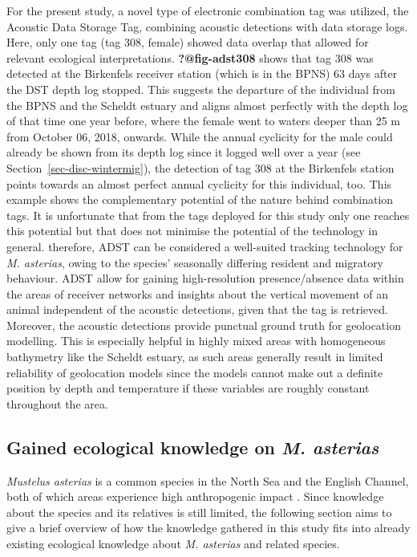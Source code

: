 \documentclass[
  authoryear,
  review,
  3p]{elsarticle}
\begin{document}
For the present study, a novel type of electronic combination tag was
utilized, the Acoustic Data Storage Tag, combining acoustic detections
with data storage logs. Here, only one tag (tag 308, female) showed data
overlap that allowed for relevant ecological interpretations.
\textbf{?@fig-adst308} shows that tag 308 was detected at the Birkenfels
receiver station (which is in the BPNS) 63 days after the DST depth log
stopped. This suggests the departure of the individual from the BPNS and
the Scheldt estuary and aligns almost perfectly with the depth log of
that time one year before, where the female went to waters deeper than
25 m from October 06, 2018, onwards. While the annual cyclicity for the
male could already be shown from its depth log since it logged well over
a year (see Section~\ref{sec-disc-wintermig}), the detection of tag 308
at the Birkenfels station points towards an almost perfect annual
cyclicity for this individual, too. This example shows the complementary
potential of the nature behind combination tags. It is unfortunate that
from the tags deployed for this study only one reaches this potential
but that does not minimise the potential of the technology in general.
therefore, ADST can be considered a well-suited tracking technology for
\emph{M. asterias}, owing to the species' seasonally differing resident
and migratory behaviour. ADST allow for gaining high-resolution
presence/absence data within the areas of receiver networks and insights
about the vertical movement of an animal independent of the acoustic
detections, given that the tag is retrieved. Moreover, the acoustic
detections provide punctual ground truth for geolocation modelling. This
is especially helpful in highly mixed areas with homogeneous bathymetry
like the Scheldt estuary, as such areas generally result in limited
reliability of geolocation models since the models cannot make out a
definite position by depth and temperature if these variables are
roughly constant throughout the area.

\hypertarget{sec-disc-otherspecies}{%
\subsection{\texorpdfstring{Gained ecological knowledge on \emph{M.
asterias}}{Gained ecological knowledge on M. asterias}}\label{sec-disc-otherspecies}}

\emph{Mustelus asterias} is a common species in the North Sea and the
English Channel, both of which areas experience high anthropogenic
impact \citep{hernandezfarinas_2014}. Since knowledge about the species
and its relatives is still limited, the following section aims to give a
brief overview of how the knowledge gathered in this study fits into
already existing ecological knowledge about \emph{M. asterias} and
related species.
\end{document}
